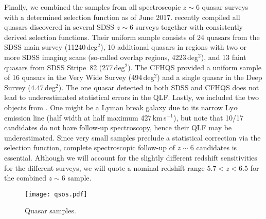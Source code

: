 \documentclass[a4paper,fleqn,usenatbib]{mnras}
\begin{document}
Finally, we combined the samples from all spectroscopic $z\sim 6$
quasar surveys with a determined selection function as of June
2017. \citet{2016ApJ...833..222J} recently compiled all quasars
discovered in several SDSS $z\sim 6$ surveys together with
consistently derived selection functions. Their uniform sample
consists of 24 quasars from the SDSS main survey (11240\,deg$^2$), 10
additional quasars in regions with two or more SDSS imaging scans
(so-called overlap regions, 4223\,deg$^2$), and 13 faint quasars from
SDSS Stripe~82 (277\,deg$^2$). The CFHQS \citep{2010AJ....139..906W}
provided a uniform sample of 16 quasars in the Very Wide Survey
(494\,deg$^2$) and a single quasar in the Deep Survey
($4.47$\,deg$^2$). The one quasar detected in both SDSS and CFHQS does
not lead to underestimated statistical errors in the QLF. Lastly, we
included the two objects from \citet{2015ApJ...798...28K}. One might
be a Lyman break galaxy due to its narrow Ly$\alpha$ emission line
(half width at half maximum 427\,km\,s$^{-1}$), but
\citet{2015ApJ...798...28K} note that 10/17 candidates do not have
follow-up spectroscopy, hence their QLF may be underestimated. Since
very small samples preclude a statistical correction via the selection
function, complete spectroscopic follow-up of $z\sim 6$ candidates is
essential. Although we will account for the slightly different
redshift sensitivities for the different surveys, we will quote a
nominal redshift range $5.7<z<6.5$ for the combined $z\sim 6$ sample.

\begin{figure*}
  \begin{center}
    \texttt{[image: qsos.pdf]}
  \end{center}
  \caption{Quasar samples.}
  \label{fig:qsos}
\end{figure*}
\end{document}
